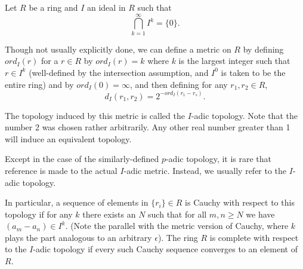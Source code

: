 \documentclass[12pt]{article}
\begin{document}
Let $R$ be a ring and $I$ an ideal in $R$ such that
\begin{equation*}
\bigcap_{k=1}^\infty I^k=\{0\}.
\end{equation*}

Though not usually explicitly done, we can define a metric on $R$ by defining $ord_I(r)$ for a $r\in R$ by $ord_I(r)=k$ where $k$ is the largest integer such that $r\in I^k$ (well-defined by the intersection assumption, and $I^0$ is taken to be the entire ring) and by $ord_I(0)=\infty$, and then defining for any $r_1,r_2\in R$,
\begin{equation*}
d_I(r_1,r_2)=2^{-ord_I(r_1-r_s)}.
\end{equation*}

The topology induced by this metric is called the $I$-adic topology.  Note that the number 2 was chosen rather arbitrarily.  Any other real number greater than 1 will induce an equivalent topology.

Except in the case of the similarly-defined $p$-adic topology, it is rare that reference is made to the actual $I$-adic metric.  Instead, we usually refer to the $I$-adic topology.

In particular, a sequence of elements in $\{r_i\}\in R$ is Cauchy with respect to this topology if for any $k$ there exists an $N$ such that for all $m,n\geq N$ we have $(a_m-a_n)\in I^k$.  (Note the parallel with the metric version of Cauchy, where $k$ plays the part analogous to an arbitrary $\epsilon$).  The ring $R$ is complete with respect to the $I$-adic topology if every such Cauchy sequence converges to an element of $R$.
\end{document}
